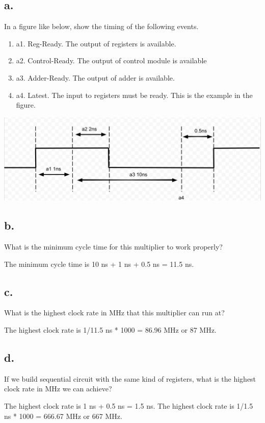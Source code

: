 \documentclass{article}
\begin{document}
\subsection*{a.}
In a figure like below, show the timing of the following events.
\begin{enumerate}
    \item a1. Reg-Ready. The output of registers is available. 
    \item a2. Control-Ready. The output of control module is available
    \item a3. Adder-Ready. The output of adder is available.
    \item a4. Latest. The input to registers must be ready. This is the example in the figure.
\end{enumerate}

\includegraphics[scale=.29]{images/Q2.png}

\subsection*{b.}
What is the minimum cycle time for this multiplier to work properly?

The minimum cycle time is 10 ns + 1 ns + 0.5 ns = 11.5 ns.

\subsection*{c.}
What is the highest clock rate in MHz that this multiplier can run at?

The highest clock rate is 1/11.5 ns * 1000 = 86.96 MHz or 87 MHz.


\subsection*{d.}
If we build sequential circuit with the same kind of registers, what is the highest clock
rate in MHz we can achieve?

The highest clock rate is 1 ns + 0.5 ns = 1.5 ns. The highest clock rate is 1/1.5 ns * 1000 = 666.67 MHz or 667 MHz.
\end{document}
